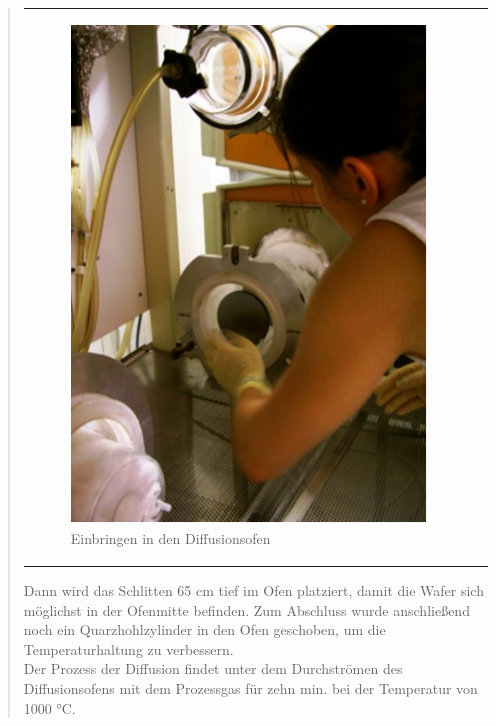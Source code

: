 \begin{quote}
\begin{center}
\begin{tabular}{ll}
\begin{minipage}{0.75\textwidth}
                        \begin{figure}[H]
                        \hspace{8em}
                            \includegraphics[scale=0.7, trim = 0cm 0cm 0cm
                            0cm, clip]
                            {./HerstellungBilder/einbringeninDiffusionsofen.png}
                            \caption{Einbringen in den Diffusionsofen}
                           \label{fig:ein_diff}
                        \end{figure}
                    \vspace{-1.5em}

                    \end{minipage}

                \end{tabular}
		\end{center}
	
		\vspace{2em}
	
		Dann wird das Schlitten 65 cm tief im Ofen platziert, damit die Wafer 
		sich möglichst in der Ofenmitte befinden. Zum Abschluss wurde 
		anschließend noch ein Quarzhohlzylinder in den Ofen geschoben, um die 
		Temperaturhaltung zu verbessern.\\
		Der Prozess der Diffusion findet unter dem Durchströmen des 
		Diffusionsofens mit dem Prozessgas für zehn min. bei der Temperatur von 
		1000 °C. 
	

\end{quote}

